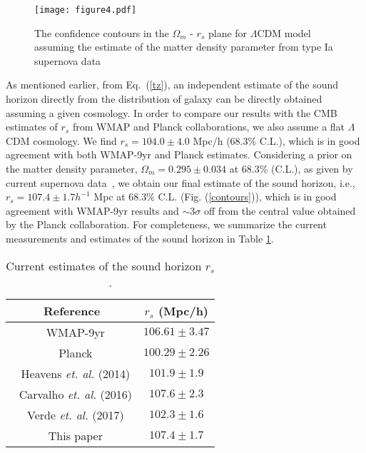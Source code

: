 \documentclass[a4paper,11pt]{article}
\begin{document}
\begin{figure} 
\begin{center}
\texttt{[image: figure4.pdf]}
\end{center}
\caption{The confidence contours in the $\Omega_m$ - $r_s$ plane for $\Lambda$CDM model assuming the estimate of the matter density parameter from type Ia supernova data}%
\label{rsomega}
\end{figure}




As mentioned earlier, from Eq.~(\ref{tz}), an independent estimate of the sound horizon directly from the distribution of galaxy can be directly obtained assuming a given cosmology. In order to compare our results with the CMB estimates of $r_s$ from WMAP and Planck collaborations, we also assume a flat $\Lambda$CDM cosmology. We find $r_s = 104.0 \pm 4.0$ Mpc/h (68.3\% C.L.), which is in good agreement with both WMAP-9yr and Planck estimates. Considering a prior on the matter density parameter, $\Omega_m = 0.295 \pm 0.034$ at 68.3\% (C.L.), as given by current supernova data~\cite{sne}, we obtain our final estimate of the sound horizon, i.e., $r_s = 107.4 \pm 1.7 h^{-1}$ Mpc at 68.3\% C.L. (Fig. (\ref{contours})), which is  in good agreement with WMAP-9yr results and $\sim 3\sigma$ off from the central value obtained by the Planck collaboration. For completeness, we summarize the current measurements and estimates of the sound horizon in Table \ref{table5}.

\begin{table}
\centering
\begin{tabular}{ cc }
 \hline  
 Reference &  $r_s$ (Mpc/h) \\
 \hline
 \,\, WMAP-9yr   \cite{wmap9}            & $106.61 \pm 3.47 $ \\
  \,\, Planck \cite{planck}             & $100.29  \pm 2.26 $ \\
  \,\,  Heavens \textit{et. al.} (2014) \cite{Heavens} & $ 101.9 \pm 1.9$ \\
  \,\, Carvalho \textit{et. al.} (2016) \cite{Carvalho} & $ 107.6 \pm 2.3$ \\
  \,\, Verde \textit{et. al.} (2017) \cite{Verde17} & $102.3 \pm 1.6$ \\
  \,\,  This paper  & $107.4 \pm 1.7$ \\
  \hline
 \end{tabular}
 \caption{Current estimates of the sound horizon $r_s$.}
 \label{table5}
\end{table}
\end{document}
